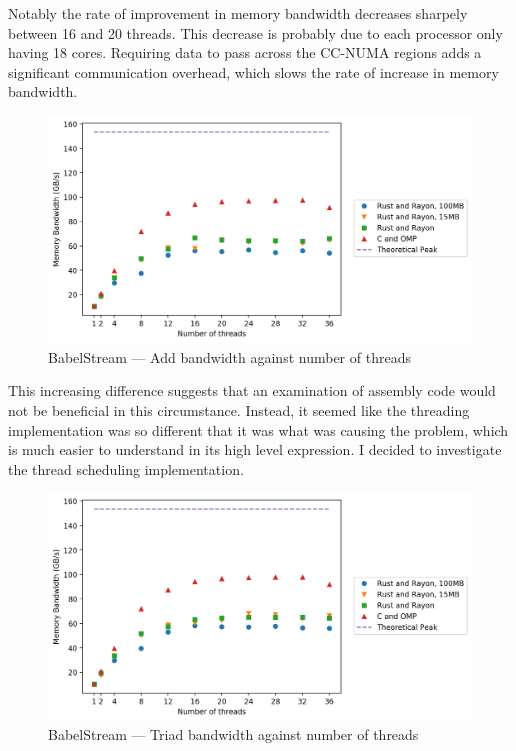 Notably the rate of improvement in memory bandwidth decreases sharpely between 16 and 20 threads. This decrease is probably due to each processor only having 18 cores. Requiring data to pass across the CC-NUMA regions adds a significant communication overhead, which slows the rate of increase in memory bandwidth.
\begin{figure}[h]
\centering
\includegraphics[width=.9\linewidth]{figs/babel/Add.png}
\caption[BabelStream --- Add]{BabelStream --- Add bandwidth against number of threads}\label{fig:babel-add}
\end{figure}

This increasing difference suggests that an examination of assembly code would not be beneficial in this circumstance. Instead, it seemed like the threading implementation was so different that it was what was causing the problem, which is much easier to understand in its high level expression. I decided to investigate the thread scheduling implementation.

\begin{figure}[h]
\centering
\includegraphics[width=.9\linewidth]{figs/babel/Triad.png}
\caption[BabelStream --- Triad]{BabelStream --- Triad bandwidth against number of threads}\label{fig:babel-triad}
\end{figure}

